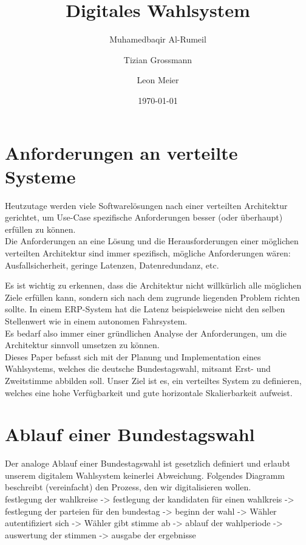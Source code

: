 \documentclass{article}  %
\title{Digitales Wahlsystem}
\author{
    Muhamedbaqir Al-Rumeil \and 
    Tizian Grossmann \and 
    Leon Meier
    }
\date{\today}  %
\begin{document}
\maketitle
\newpage

\tableofcontents
\newpage

\section{Anforderungen an verteilte Systeme}

Heutzutage werden viele Softwarelösungen nach einer verteilten Architektur gerichtet, um Use-Case spezifische Anforderungen besser (oder überhaupt) erfüllen zu können. \\
Die Anforderungen an eine Lösung und die Herausforderungen einer möglichen verteilten Architektur sind immer spezifisch, mögliche Anforderungen wären: Ausfallsicherheit, geringe Latenzen, Datenredundanz, etc.

Es ist wichtig zu erkennen, dass die Architektur nicht willkürlich alle möglichen Ziele erfüllen kann, sondern sich nach dem zugrunde liegenden Problem richten sollte. In einem ERP-System hat die Latenz beispielsweise nicht den selben Stellenwert wie in einem autonomen Fahrsystem. \\
Es bedarf also immer einer gründlichen Analyse der Anforderungen, um die Architektur sinnvoll umsetzen zu können. \\


Dieses Paper befasst sich mit der Planung und Implementation eines Wahlsystems, welches die deutsche Bundestagswahl, mitsamt Erst- und Zweitstimme abbilden soll. Unser Ziel ist es, ein verteiltes System zu definieren, welches eine hohe Verfügbarkeit und gute horizontale Skalierbarkeit aufweist.
  
\newpage

\section{Ablauf einer Bundestagswahl}
Der analoge Ablauf einer Bundestagswahl ist gesetzlich definiert und erlaubt unserem digitalem Wahlsystem keinerlei Abweichung. Folgendes Diagramm beschreibt (vereinfacht) den Prozess, den wir digitalisieren wollen. \\

festlegung der wahlkreise -> festlegung der kandidaten für einen wahlkreis -> festlegung der parteien für den bundestag -> beginn der wahl -> Wähler autentifiziert sich -> Wähler gibt stimme ab -> ablauf der wahlperiode -> auswertung der stimmen -> ausgabe der ergebnisse
\end{document}
